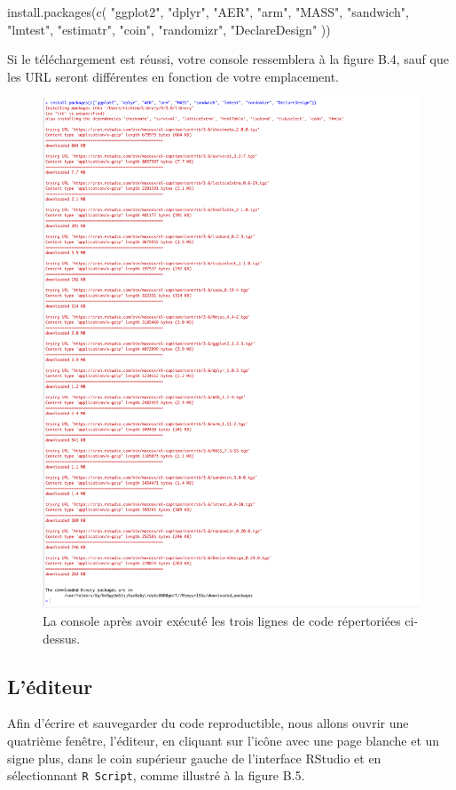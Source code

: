 \documentclass[
  12pt,
]{book}
\newenvironment{Shaded}{\begin{snugshade}}{\end{snugshade}}
\newcommand{\FunctionTok}[1]{\textcolor[rgb]{0.00,0.00,0.00}{#1}}
\newcommand{\NormalTok}[1]{#1}
\newcommand{\StringTok}[1]{\textcolor[rgb]{0.31,0.60,0.02}{#1}}
\begin{document}
\begin{Shaded}
\begin{Highlighting}[]
\FunctionTok{install.packages}\NormalTok{(}\FunctionTok{c}\NormalTok{(}
  \StringTok{"ggplot2"}\NormalTok{, }\StringTok{"dplyr"}\NormalTok{, }\StringTok{"AER"}\NormalTok{, }\StringTok{"arm"}\NormalTok{, }\StringTok{"MASS"}\NormalTok{, }\StringTok{"sandwich"}\NormalTok{,}
  \StringTok{"lmtest"}\NormalTok{, }\StringTok{"estimatr"}\NormalTok{, }\StringTok{"coin"}\NormalTok{, }\StringTok{"randomizr"}\NormalTok{, }\StringTok{"DeclareDesign"}
\NormalTok{))}
\end{Highlighting}
\end{Shaded}

Si le téléchargement est réussi, votre console ressemblera à la figure B.4, sauf que les URL seront différentes en fonction de votre emplacement.

\begin{figure}
\includegraphics[width=0.4\linewidth]{Images/console2a} \caption{La console après avoir exécuté les trois lignes de code répertoriées ci-dessus.}\label{fig:console2}
\end{figure}

\hypertarget{luxe9diteur}{%
\subsection{L'éditeur}\label{luxe9diteur}}

Afin d'écrire et sauvegarder du code reproductible, nous allons ouvrir une quatrième fenêtre, l'éditeur, en cliquant sur l'icône avec une page blanche et un signe plus, dans le coin supérieur gauche de l'interface RStudio et en sélectionnant \texttt{R\ Script}, comme illustré à la figure B.5.
\end{document}
